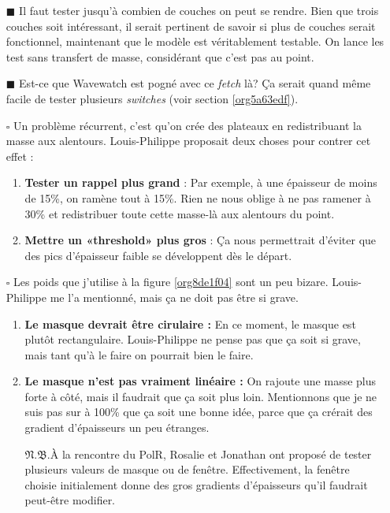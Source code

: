 \documentclass[10pt]{report}
\numberwithin{equation}{section}
\renewcommand{\boxtimes}{\blacksquare}
\newcommand{\pt}{\hspace{1pt}} %
\newcommand{\nb}{\underline{{\footnotesize\EightStarConvex}\pt $\mathfrak{N.B.}$\vphantom{p}}\hspace{3pt}}
\begin{document}
\begin{itemize}
\item[{$\boxtimes$}] Il faut tester jusqu'à combien de couches on peut se rendre.
Bien que trois couches soit intéressant, il serait pertinent de savoir si plus de couches serait fonctionnel, maintenant que le modèle est véritablement testable.
On lance les test sans transfert de masse, considérant que c'est pas au point.\bigskip

\item[{$\boxtimes$}] Est-ce que Wavewatch est pogné avec ce \emph{fetch} là? Ça serait quand même facile de tester plusieurs \emph{switches} (voir section \ref{org5a63edf}). \bigskip

\item[{$\square$}] Un problème récurrent, c'est qu'on crée des plateaux en redistribuant la masse aux alentours.
Louis-Philippe proposait deux choses pour contrer cet effet :
\begin{enumerate}
\item \textbf{Tester un rappel plus grand} : Par exemple, à une épaisseur de moins de 15\%, on ramène tout à 15\%.
Rien ne nous oblige à ne pas ramener à 30\% et redistribuer toute cette masse-là aux alentours du point.
\item \textbf{Mettre un «threshold» plus gros} : Ça nous permettrait d'éviter que des pics d'épaisseur faible se développent dès le départ.\bigskip
\end{enumerate}

\item[{$\square$}] Les poids que j'utilise à la figure \ref{org8de1f04} sont un peu bizare.
Louis-Philippe me l'a mentionné, mais ça ne doit pas être si grave. 
\begin{enumerate}
\item \textbf{Le masque devrait être cirulaire :}
En ce moment, le masque est plutôt rectangulaire.
Louis-Philippe ne pense pas que ça soit si grave, mais tant qu'à le faire on pourrait bien le faire.
\item \textbf{Le masque n'est pas vraiment linéaire :} On rajoute une masse plus forte à côté, mais il faudrait que ça soit plus loin.
Mentionnons que je ne suis pas sur à 100\% que ça soit une bonne idée, parce que ça crérait des gradient d'épaisseurs un peu étranges.\bigskip

\nb À la rencontre du PolR, Rosalie et Jonathan ont proposé de tester plusieurs valeurs de masque ou de fenêtre.
Effectivement, la fenêtre choisie initialement donne des gros gradients d'épaisseurs qu'il faudrait peut-être modifier.\bigskip
\end{enumerate}


\end{itemize}
\end{document}
